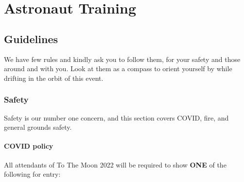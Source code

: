 %


\chapter{Astronaut Training}


\section*{Guidelines}
We have few rules and kindly ask you to follow them, for your safety and those around and with you.  Look at them as a compass to orient yourself by while drifting in the orbit of this event. 

\subsection*{Safety}
Safety is our number one concern, and this section covers COVID, fire, and general grounds safety.

\subsubsection*{COVID policy}
\label{covid-policy}


All attendants of To The Moon 2022 will be required to show \textbf{ONE} of the following for entry:

